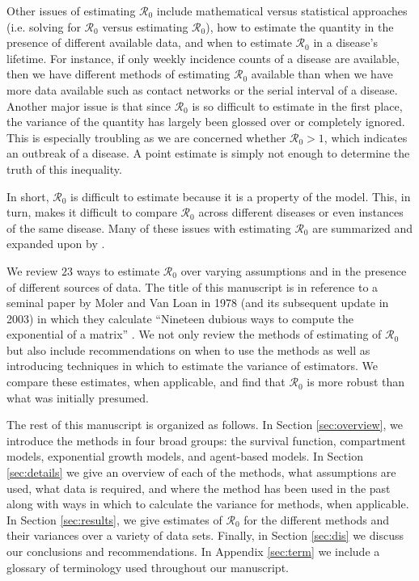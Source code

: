 \documentclass[12pt]{article}
\newcommand{\XX}{\ensuremath{23}} %
\newcommand{\rr}{\ensuremath{\mathcal{R}_0}}
\begin{document}
Other issues of estimating $\rr$ include mathematical versus statistical approaches (i.e. solving for $\rr$ versus estimating $\rr$), how to estimate the quantity in the presence of different available data, and when to estimate $\rr$ in a disease's lifetime.  For instance, if only weekly incidence counts of a disease are available, then we have different methods of estimating $\rr$ available than when we have more data available such as contact networks or the serial interval of a disease.  Another major issue is that since $\rr$ is so difficult to estimate in the first place, the variance of the quantity has largely been glossed over or completely ignored.  This is especially troubling as we are concerned whether $\rr > 1$, which indicates an outbreak of a disease.  A point estimate is simply not enough to determine the truth of this inequality.

In short, $\rr$ is difficult to estimate because it is a property of the model.  This, in turn, makes it difficult to compare $\rr$ across different diseases or even instances of the same disease.  Many of these issues with estimating $\rr$ are summarized and expanded upon by \cite{li2011}.

We review $\XX$ ways to estimate $\rr$ over varying assumptions and in the presence of different sources of data.  The title of this manuscript is in reference to a seminal paper by Moler and Van Loan in 1978 (and its subsequent update in 2003) in which they calculate ``Nineteen dubious ways to compute the exponential of a matrix'' \citep{moler2003}.  We not only review the methods of estimating of $\rr$ but also include recommendations on when to use the methods as well as introducing techniques in which to estimate the variance of estimators.  We compare these estimates, when applicable, and find that $\rr$ is more robust than what was initially presumed.

The rest of this manuscript is organized as follows.  In Section \ref{sec:overview}, we introduce the methods in four broad groups: the survival function, compartment models, exponential growth models, and agent-based models.    In Section \ref{sec:details} we give an overview of each of the methods, what assumptions are used, what data is required, and where the method has been used in the past along with ways in which to calculate the variance for methods, when applicable.  In Section \ref{sec:results}, we give estimates of $\rr$ for the different methods and their variances over a variety of data sets.  Finally, in Section \ref{sec:dis} we discuss our conclusions and recommendations.  In Appendix \ref{sec:term} we include a glossary of terminology used throughout our manuscript.
\end{document}
